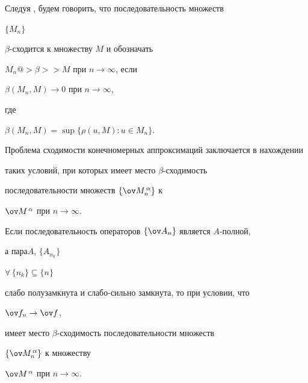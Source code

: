  


Следуя \cite{4}, будем говорить, что последовательность множеств 


$\{M_n\}$\; 


$\beta$-сходится к множеству $M$ и обозначать 


$M_n@>{\beta}>>M$ при $n\to\infty$, если 


$\beta(M_n,M)\to 0$ при $n\to \infty$, 


где 


$\beta(M_n,M)=\sup\{\rho(u,M):u\in M_n\}$. 


 


Проблема сходимости конечномерных аппроксимаций заключается в нахождении 


таких условий, при которых имеет место $\beta$-сходимость 


последовательности множеств $\{\ov M^{\,\alpha}_n\}$ к 


$\ov M^{\,\alpha}$ при $n\to\infty$. 


 


\begin{thm} 


Если последовательность операторов $\{\ov A_n\}$ является $A$-полной, 


а пара\linebreak $A$, $\{A_{n_k}\}$ 


$\forall\,\{n_k\}\subseteq\{n\}$ 


слабо полузамкнута и слабо-сильно замкнута, то при условии, что \linebreak


$\ov f_n\to\ov f$,


имеет место $\beta$-сходимость последовательности множеств 


$\{\ov M^{\,\alpha}_n\}$ к множеству 


$\ov M^{\,\alpha}$ при $n\to\infty$. 


\end{thm} 


 


